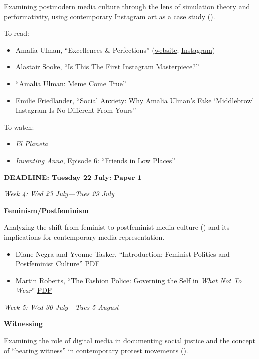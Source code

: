 \documentclass[
  letterpaper,
  DIV=11,
  numbers=noendperiod]{scrartcl}
\providecommand{\tightlist}{%
  \setlength{\itemsep}{0pt}\setlength{\parskip}{0pt}}
\begin{document}
Examining postmodern media culture through the lens of simulation theory
and performativity, using contemporary Instagram art as a case study
().

To read:

\begin{itemize}
\tightlist
\item
  Amalia Ulman, ``Excellences \& Perfections''
  (\href{http://amaliaulman.eu/}{website};
  \href{https://www.instagram.com/amaliaulman/}{Instagram})
\item
  Alastair Sooke, ``Is This The First Instagram Masterpiece?''
\item
  ``Amalia Ulman: Meme Come True''
\item
  Emilie Friedlander, ``Social Anxiety: Why Amalia Ulman's Fake
  `Middlebrow' Instagram Is No Different From Yours''
\end{itemize}

To watch:

\begin{itemize}
\tightlist
\item
  \emph{El Planeta}
\item
  \emph{Inventing Anna}, Episode 6: ``Friends in Low Places''
\end{itemize}

\textbf{DEADLINE: Tuesday 22 July: Paper 1}

\emph{Week 4: Wed 23 July---Tues 29 July}

\textbf{Feminism/Postfeminism}

Analyzing the shift from feminist to postfeminist media culture
() and its
implications for contemporary media representation.

\begin{itemize}
\tightlist
\item
  Diane Negra and Yvonne Tasker, ``Introduction: Feminist Politics and
  Postfeminist Culture''
  \href{pdf/interrogating-postfeminism-intro.pdf}{PDF}
\item
  Martin Roberts, ``The Fashion Police: Governing the Self in \emph{What
  Not To Wear}'' \href{pdf/fashion-police.pdf}{PDF}
\end{itemize}

\emph{Week 5: Wed 30 July---Tues 5 August}

\textbf{Witnessing}

Examining the role of digital media in documenting social justice and
the concept of ``bearing witness'' in contemporary protest movements
().
\end{document}
